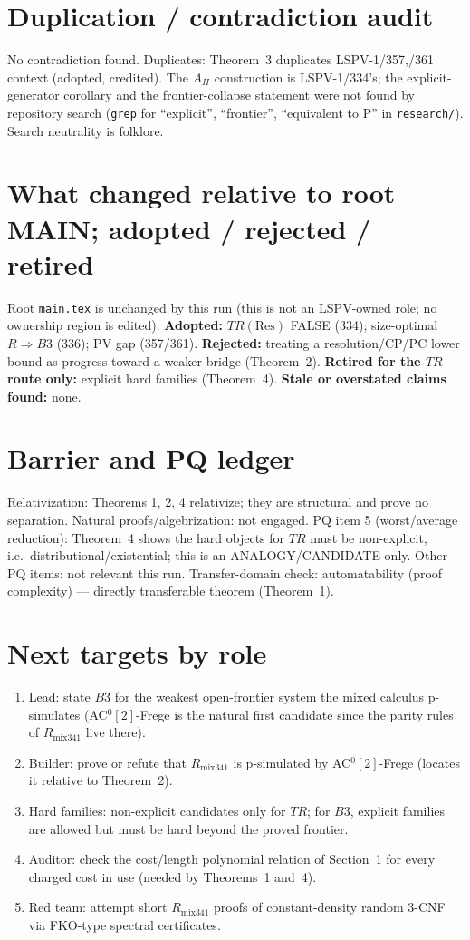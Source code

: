 \documentclass[11pt]{article}
\begin{document}
\section{Duplication / contradiction audit}
No contradiction found. Duplicates: Theorem~3 duplicates LSPV-1/357,/361
context (adopted, credited). The $A_H$ construction is LSPV-1/334's; the
explicit-generator corollary and the frontier-collapse statement were not
found by repository search (\texttt{grep} for ``explicit'', ``frontier'',
``equivalent to P'' in \texttt{research/}). Search neutrality is folklore.

\section{What changed relative to root MAIN; adopted / rejected / retired}
Root \texttt{main.tex} is unchanged by this run (this is not an LSPV-owned
role; no ownership region is edited). \textbf{Adopted:} $TR(\mathrm{Res})$
FALSE (334); size-optimal $R\Rightarrow B3$ (336); PV gap (357/361).
\textbf{Rejected:} treating a resolution/CP/PC lower bound as progress toward
a weaker bridge (Theorem~2). \textbf{Retired for the $TR$ route only:}
explicit hard families (Theorem~4). \textbf{Stale or overstated claims found:} none.

\section{Barrier and PQ ledger}
Relativization: Theorems 1, 2, 4 relativize; they are structural and prove no
separation. Natural proofs/algebrization: not engaged. PQ item 5
(worst/average reduction): Theorem~4 shows the hard objects for $TR$ must be
non-explicit, i.e.\ distributional/existential; this is an
ANALOGY/CANDIDATE only. Other PQ items: not relevant this run.
Transfer-domain check: automatability (proof complexity) --- directly
transferable theorem (Theorem~1).

\section{Next targets by role}
\begin{enumerate}
\item Lead: state $B3$ for the weakest open-frontier system the mixed
calculus p-simulates (AC$^0[2]$-Frege is the natural first candidate since
the parity rules of $R_{\mathrm{mix341}}$ live there).
\item Builder: prove or refute that $R_{\mathrm{mix341}}$ is p-simulated by
AC$^0[2]$-Frege (locates it relative to Theorem~2).
\item Hard families: non-explicit candidates only for $TR$; for $B3$,
explicit families are allowed but must be hard beyond the proved frontier.
\item Auditor: check the cost/length polynomial relation of Section~1 for
every charged cost in use (needed by Theorems~1 and~4).
\item Red team: attempt short $R_{\mathrm{mix341}}$ proofs of constant-density
random 3-CNF via FKO-type spectral certificates.
\end{enumerate}
\end{document}
